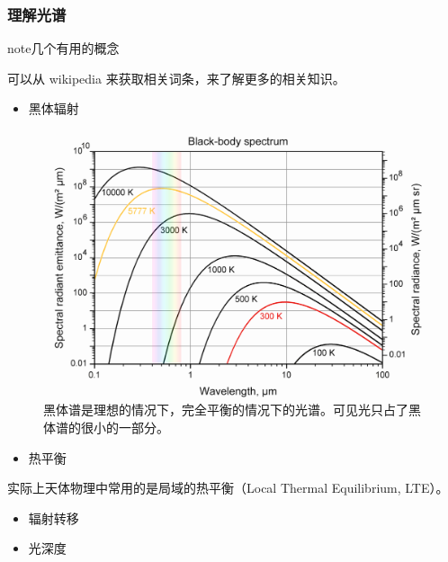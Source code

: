 \documentclass[letterpaper,10pt,english]{sphinxmanual}
\begin{document}
\subsubsection{理解光谱}
\label{atmosphere:index-0}\label{atmosphere:id3}
\begin{notice}{note}{几个有用的概念}

可以从 wikipedia 来获取相关词条，来了解更多的相关知识。
\begin{itemize}
\item {} 
黑体辐射

\end{itemize}
\begin{figure}[htbp]
\centering
\capstart

\includegraphics{blackbody.png}
\caption{黑体谱是理想的情况下，完全平衡的情况下的光谱。可见光只占了黑体谱的很小的一部分。}\end{figure}
\begin{itemize}
\item {} 
热平衡

\end{itemize}

实际上天体物理中常用的是局域的热平衡（Local Thermal Equilibrium, LTE）。
\begin{itemize}
\item {} 
辐射转移

\item {} 
光深度

\end{itemize}
\end{notice}
\end{document}
